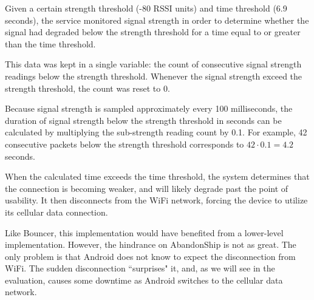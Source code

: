 Given a certain strength threshold (-80 RSSI units) and time threshold (6.9 seconds), the service monitored signal strength in order to determine whether the signal had degraded below the strength threshold for a time equal to or greater than the time threshold.

This data was kept in a single variable: the count of consecutive signal strength readings below the strength threshold. Whenever the signal strength exceed the strength threshold, the count was reset to 0.

Because signal strength is sampled approximately every 100 milliseconds, the duration of signal strength below the strength threshold in seconds can be calculated by multiplying the sub-strength reading count by 0.1. For example, 42 consecutive packets below the strength threshold corresponds to $ 42 \cdot 0.1 = 4.2 $ seconds.

When the calculated time exceeds the time threshold, the system determines that the connection is becoming weaker, and will likely degrade past the point of usability. It then disconnects from the WiFi network, forcing the device to utilize its cellular data connection.

Like Bouncer, this implementation would have benefited from a lower-level implementation. However, the hindrance on AbandonShip is not as great. The only problem is that Android does not know to expect the disconnection from WiFi. The sudden disconnection ``surprises" it, and, as we will see in the evaluation, causes some downtime as Android switches to the cellular data network.
